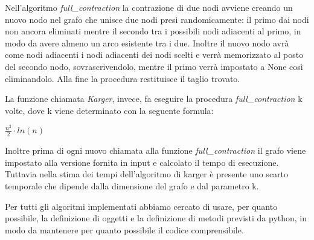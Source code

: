 Nell'algoritmo \textit{full\_contraction} la contrazione di due nodi avviene creando un nuovo nodo nel grafo che unisce due nodi presi randomicamente: il primo dai nodi non ancora eliminati mentre il secondo tra i possibili nodi adiacenti al primo, in modo da avere almeno un arco esistente tra i due.
Inoltre il nuovo nodo avrà come nodi adiacenti i nodi adiacenti dei nodi scelti e verrà memorizzato al posto del secondo nodo, sovrascrivendolo, mentre il primo verrà impostato a None così eliminandolo.
Alla fine la procedura restituisce il taglio trovato.

La funzione chiamata \textit{Karger}, invece, fa eseguire la procedura \textit{full\_contraction} k volte, dove k viene determinato con la seguente formula: 

\centerline{\(\frac{n^{2}}{2}\cdot ln(n)\)}

Inoltre prima di ogni nuovo chiamata alla funzione \textit{full\_contraction} il grafo viene impostato alla versione fornita in input e calcolato il tempo di esecuzione. Tuttavia nella stima dei tempi dell'algoritmo di karger è presente uno scarto temporale che dipende dalla dimensione del grafo e dal parametro k.

Per tutti gli algoritmi implementati abbiamo cercato di usare, per quanto possibile, la definizione di oggetti e la definizione di metodi previsti da python, in modo da mantenere per quanto possibile il codice comprensibile.
